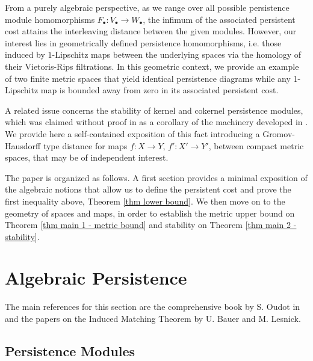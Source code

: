 \documentclass[11pt]{article}
\newcommand{\bu}{_{\bullet}}
\begin{document}
From a purely algebraic perspective, as we range over all possible persistence module homomorphisms $F\bu:V\bu\to W\bu$, the infimum of the associated persistent cost attains the interleaving distance between the given modules. However, our interest lies in geometrically defined persistence homomorphisms, i.e. those induced by $1$-Lipschitz maps between the underlying spaces via the homology of their Vietoris-Rips filtrations. In this geometric context, we provide an example of two finite metric spaces that yield identical persistence diagrams while any 1-Lipschitz map is bounded away from zero in its associated persistent cost.

A related issue concerns the stability of kernel and cokernel persistence modules, which was claimed without proof in \cite{cohen2009persistent} as a corollary of the machinery developed in \cite{cohen2005stability}. 
We provide here a self-contained exposition of this fact introducing a Gromov-Hausdorff type distance for maps $f:X\to Y$, $f':X'\to Y'$, between compact metric spaces, that may be of independent interest.



\medskip
The paper is organized as follows. A first section provides a minimal exposition of the algebraic notions that allow us to define the persistent cost and prove the first inequality above, Theorem \ref{thm lower bound}. We then move on to the geometry of spaces and maps, in order to establish the metric upper bound on Theorem \ref{thm main 1 - metric bound} and stability on Theorem \ref{thm main 2 - stability}. 


\section{Algebraic Persistence}

The main references for this section are the comprehensive book by S. Oudot in \cite{oudot2015persistence} and the papers on the Induced Matching Theorem \cite{bauer2015induced,bauer2020persistence} by U. Bauer and M. Lesnick. 


\subsection{Persistence Modules}
\end{document}
